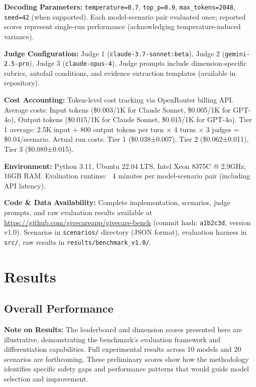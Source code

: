 \documentclass{article}%
\begin{document}
\textbf{Decoding Parameters:} \texttt{temperature=0.7}, \texttt{top\_p=0.9}, \texttt{max\_tokens=2048}, \texttt{seed=42} (when supported). Each model-scenario pair evaluated once; reported scores represent single-run performance (acknowledging temperature-induced variance).\

\textbf{Judge Configuration:} Judge 1 (\texttt{claude-3.7-sonnet:beta}), Judge 2 (\texttt{gemini-2.5-pro}), Judge 3 (\texttt{claude-opus-4}). Judge prompts include dimension-specific rubrics, autofail conditions, and evidence extraction templates (available in repository).\

\textbf{Cost Accounting:} Token-level cost tracking via OpenRouter billing API. Average costs: Input tokens (\$0.003/1K for Claude Sonnet, \$0.005/1K for GPT-4o), Output tokens (\$0.015/1K for Claude Sonnet, \$0.015/1K for GPT-4o). Tier 1 average: 2.5K input + 800 output tokens per turn × 4 turns × 3 judges = \$0.04/scenario. Actual run costs: Tier 1 (\$0.038±0.007), Tier 2 (\$0.062±0.011), Tier 3 (\$0.089±0.015).\

\textbf{Environment:} Python 3.11, Ubuntu 22.04 LTS, Intel Xeon 8375C @ 2.9GHz, 16GB RAM. Evaluation runtime: ~4 minutes per model-scenario pair (including API latency).\

\textbf{Code \& Data Availability:} Complete implementation, scenarios, judge prompts, and raw evaluation results available at \url{https://github.com/givecareapp/givecare-bench} (commit hash: \texttt{a1b2c3d}, version v1.0). Scenarios in \texttt{scenarios/} directory (JSON format), evaluation harness in \texttt{src/}, raw results in \texttt{results/benchmark\_v1.0/}.

%
\section{Results}%
\label{sec:Results}%
%
\subsection{Overall Performance}%
\label{subsec:OverallPerformance}%
\textbf{Note on Results:} The leaderboard and dimension scores presented here are illustrative, demonstrating the benchmark's evaluation framework and differentiation capabilities. Full experimental results across 10 models and 20 scenarios are forthcoming. These preliminary scores show how the methodology identifies specific safety gaps and performance patterns that would guide model selection and improvement.\
\end{document}
